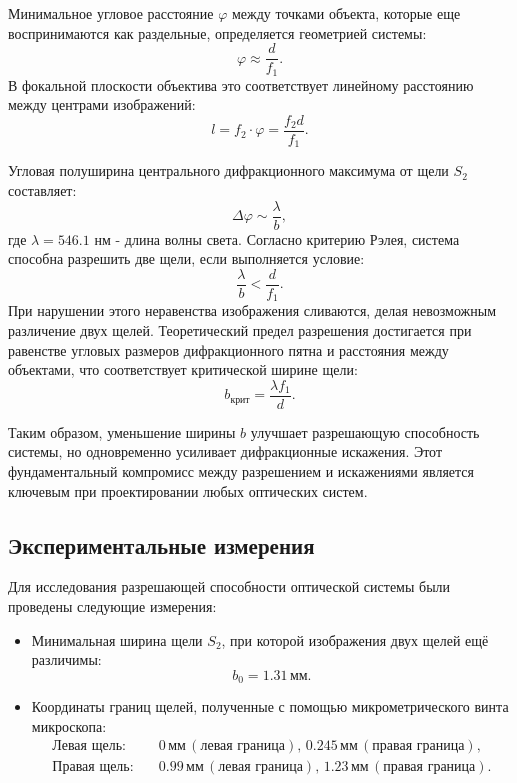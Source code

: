 Минимальное угловое расстояние $\varphi$ между точками объекта, которые еще воспринимаются как раздельные, определяется геометрией системы:
\[
\varphi \approx \frac{d}{f_1}.
\]
В фокальной плоскости объектива это соответствует линейному расстоянию между центрами изображений:
\[
l = f_2 \cdot \varphi = \frac{f_2 d}{f_1}.
\]

Угловая полуширина центрального дифракционного максимума от щели $S_2$ составляет:
\[
\Delta \varphi \sim \frac{\lambda}{b},
\]
где $\lambda = 546.1$ нм - длина волны света. Согласно критерию Рэлея, система способна разрешить две щели, если выполняется условие:
\[
\frac{\lambda}{b} < \frac{d}{f_1}.
\]
При нарушении этого неравенства изображения сливаются, делая невозможным различение двух щелей. Теоретический предел разрешения достигается при равенстве угловых размеров дифракционного пятна и расстояния между объектами, что соответствует критической ширине щели:
\[
b_{\text{крит}} = \frac{\lambda f_1}{d}.
\]

Таким образом, уменьшение ширины $b$ улучшает разрешающую способность системы, но одновременно усиливает дифракционные искажения. Этот фундаментальный компромисс между разрешением и искажениями является ключевым при проектировании любых оптических систем.

\subsection{Экспериментальные измерения}  
Для исследования разрешающей способности оптической системы были проведены следующие измерения:  
\begin{itemize}  
    \item Минимальная ширина щели $S_2$, при которой изображения двух щелей ещё различимы:  
    \[  
    b_0 = 1.31 \, \text{мм}.  
    \]  
    \item Координаты границ щелей, полученные с помощью микрометрического винта микроскопа:  
    \begin{align*}  
        \text{Левая щель:} & \quad 0 \, \text{мм} \, (\text{левая граница}), \, 0.245 \, \text{мм} \, (\text{правая граница}), \\  
        \text{Правая щель:} & \quad 0.99 \, \text{мм} \, (\text{левая граница}), \, 1.23 \, \text{мм} \, (\text{правая граница}).  
    \end{align*}  
\end{itemize}  

